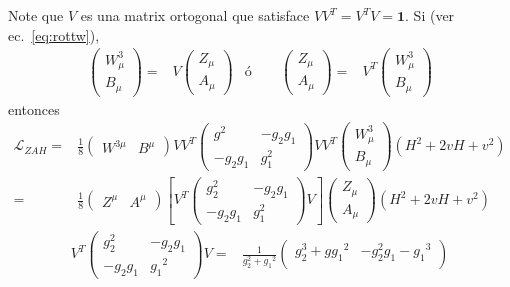 \begin{frame}
Note que $V$ es una matrix ortogonal que satisface $VV^T=V^TV=\mathbf{1}$. Si (ver ec.~\eqref{eq:rottw}),
\begin{align}
  \begin{pmatrix}
    W^3_\mu\\
    B_\mu
  \end{pmatrix}=&V
  \begin{pmatrix}
    Z_\mu\\
    A_\mu
  \end{pmatrix}&\text{ó}\qquad
  \begin{pmatrix}
    Z_\mu\\
    A_\mu
  \end{pmatrix}=&V^T
  \begin{pmatrix}
    W^3_\mu\\
    B_\mu
  \end{pmatrix}
\end{align}
entonces
\begin{align}
  \mathcal{L}_{ZAH}=&\frac{1}{8}
  \begin{pmatrix}
    W^{3\mu} & B^\mu
  \end{pmatrix}VV^T
  \begin{pmatrix}
    g^2&-g_2{g_1}\\
    -g_2{g_1}&g_1^2
  \end{pmatrix}VV^T
  \begin{pmatrix}
    W^3_\mu\\
    B_\mu
  \end{pmatrix}
\left(H^2+2vH+v^2\right)\nonumber\\
=&\frac{1}{8}
  \begin{pmatrix}
    Z^\mu & A^\mu
  \end{pmatrix}\left[V^T
  \begin{pmatrix}
    g_2^2&-g_2{g_1}\\
    -g_2{g_1}&g_1^2
  \end{pmatrix}V\right]
  \begin{pmatrix}
    Z_\mu\\
    A_\mu
  \end{pmatrix}
\left(H^2+2vH+v^2\right)
\end{align}
\begin{align}
  V^T
  \begin{pmatrix}
    g_2^2&-g_2{g_1}\\
    -g_2{g_1}&{{g_1}}^2
  \end{pmatrix}V=&\frac{1}{g_2^2+{{g_1}}^2}
  \begin{pmatrix}
    g_2^3+g{{g_1}}^2 & -g_2^2{g_1}-{{g_1}}^3\\

\end{pmatrix}
\end{align}
\end{frame}
